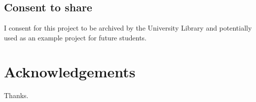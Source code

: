 \documentclass[12pt, a4paper]{report}
\begin{document}
\section*{Consent to share}
I consent for this project to be archived by the University Library and potentially used as an example project for future students.

\newpage
\renewcommand{\contentsname}{Table of Contents}	%
\tableofcontents

\newpage
{}	%
\listoftables

\newpage
{}	%
\listoffigures


\newpage

{}
\chapter*{Acknowledgements}
Thanks.
\newpage




%








% 


\newpage
{}
{}
\printbibliography
\end{document}
